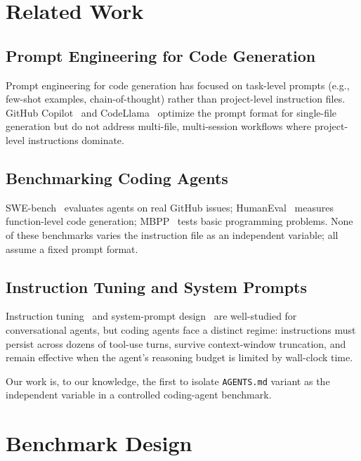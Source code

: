 \documentclass[journal]{IEEEtran}
\begin{document}
\section{Related Work}
\label{sec:related}

\subsection{Prompt Engineering for Code Generation}
Prompt engineering for code generation has focused on task-level prompts (e.g.,
few-shot examples, chain-of-thought) rather than project-level instruction files.
GitHub Copilot~\cite{copilot} and CodeLlama~\cite{codellama} optimize the prompt
format for single-file generation but do not address multi-file, multi-session workflows
where project-level instructions dominate.

\subsection{Benchmarking Coding Agents}
SWE-bench~\cite{swebench} evaluates agents on real GitHub issues; HumanEval~\cite{humaneval}
measures function-level code generation; MBPP~\cite{mbpp} tests basic programming
problems.
None of these benchmarks varies the instruction file as an independent variable;
all assume a fixed prompt format.

\subsection{Instruction Tuning and System Prompts}
Instruction tuning~\cite{instructgpt} and system-prompt design~\cite{systemprompt}
are well-studied for conversational agents, but coding agents face a distinct regime:
instructions must persist across dozens of tool-use turns, survive context-window
truncation, and remain effective when the agent's reasoning budget is limited by
wall-clock time.

Our work is, to our knowledge, the first to isolate \texttt{AGENTS.md} variant as
the independent variable in a controlled coding-agent benchmark.

\section{Benchmark Design}
\label{sec:design}
\end{document}
